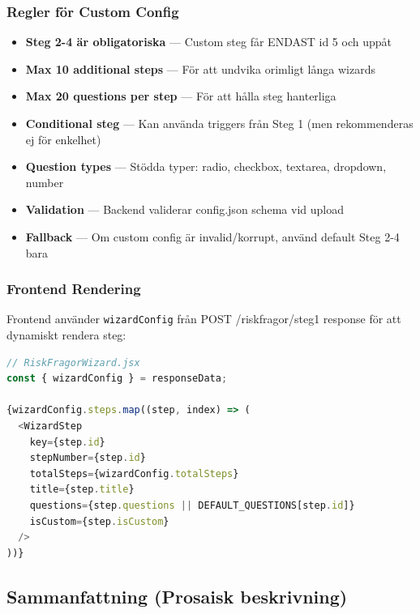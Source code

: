 \documentclass[12pt,a4paper]{article}
\begin{document}
\subsubsection{Regler för Custom Config}

\begin{itemize}[noitemsep]
  \item \textbf{Steg 2-4 är obligatoriska} — Custom steg får ENDAST id 5 och uppåt
  \item \textbf{Max 10 additional steps} — För att undvika orimligt långa wizards
  \item \textbf{Max 20 questions per step} — För att hålla steg hanterliga
  \item \textbf{Conditional steg} — Kan använda triggers från Steg 1 (men rekommenderas ej för enkelhet)
  \item \textbf{Question types} — Stödda typer: radio, checkbox, textarea, dropdown, number
  \item \textbf{Validation} — Backend validerar config.json schema vid upload
  \item \textbf{Fallback} — Om custom config är invalid/korrupt, använd default Steg 2-4 bara
\end{itemize}

\subsubsection{Frontend Rendering}

Frontend använder \texttt{wizardConfig} från POST /riskfragor/steg1 response för att dynamiskt rendera steg:

\begin{lstlisting}[language=javascript]
// RiskFragorWizard.jsx
const { wizardConfig } = responseData;

{wizardConfig.steps.map((step, index) => (
  <WizardStep 
    key={step.id}
    stepNumber={step.id}
    totalSteps={wizardConfig.totalSteps}
    title={step.title}
    questions={step.questions || DEFAULT_QUESTIONS[step.id]}
    isCustom={step.isCustom}
  />
))}
\end{lstlisting}

\subsection{Sammanfattning (Prosaisk beskrivning)}
\end{document}
